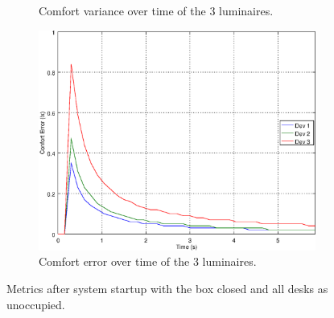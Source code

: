 \begin{figure}[ht]
\begin{subfigure}[t]{0.3\textwidth}
    \caption{Comfort variance over time of the 3 luminaires.}
    \label{fig:f_closed_o000}
    \end{subfigure}
    \begin{subfigure}[t]{0.3\textwidth}
    \centering
    \includegraphics[width=.95\textwidth]{img/n_closed_o000}
    \caption{Comfort error over time of the 3 luminaires.}
    \label{fig:n_closed_o000}
    \end{subfigure}
    \caption{Metrics after system startup with the box closed and all desks as unoccupied. }
\end{figure}


